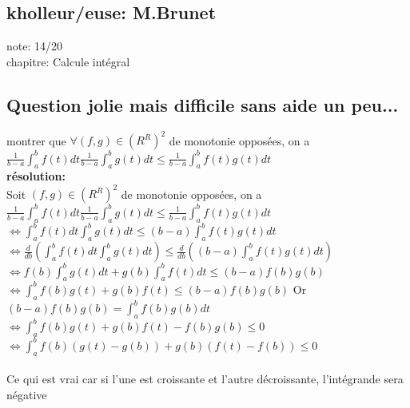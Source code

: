 \documentclass{article}
\begin{document}
\subsection{kholleur/euse: M.Brunet}

note: 14/20 \\
chapitre: Calcule intégral

\subsection{Question jolie mais difficile sans aide un peu...}

montrer que $\forall (f,g) \in (R^R)^2$ de monotonie opposées, on a \\

$\frac{1}{b-a}\int_a^b f(t) dt \frac{1}{b-a}\int_a^b g(t) dt \leqslant \frac{1}{b-a}\int_a^b f(t) g(t) dt $ \\

\vspace{0.2cm}
\textbf{\large résolution:} \\

\vspace{0.1cm}
Soit $(f,g) \in (R^R)^2$ de monotonie opposées, on a \\

$\frac{1}{b-a}\int_a^b f(t) dt \frac{1}{b-a}\int_a^b g(t) dt \leqslant \frac{1}{b-a}\int_a^b f(t) g(t) dt $ \\
$\Leftrightarrow \int_a^b f(t) dt \int_a^b g(t) dt \leqslant (b-a) \int_a^b f(t) g(t) dt $ \\
$\Leftrightarrow \frac{d}{db} \left( \int_a^b f(t) dt \int_a^b g(t) dt \right) \leqslant \frac{d}{db} \left( (b-a) \int_a^b f(t) g(t) dt \right)$ \\
$\Leftrightarrow f(b) \int_a^b g(t) dt + g(b) \int_a^b f(t) dt  \leqslant (b-a) f(b)g(b)$ \\
$\Leftrightarrow \int_a^b f(b)g(t) + g(b)f(t) \leqslant (b-a) f(b)g(b)$ \hspace{0.2cm} Or $(b-a)f(b)g(b) = \int_a^b f(b)g(b) dt$ \\
$\Leftrightarrow \int_a^b f(b)g(t) + g(b)f(t) - f(b)g(b) \leqslant 0$ \\ 
$\Leftrightarrow \int_a^b f(b)(g(t) - g(b)) + g(b)(f(t) - f(b)) \leqslant 0$ \\ \\

Ce qui est vrai car si l'une est croissante et l'autre décroissante, l'intégrande sera négative
\end{document}
